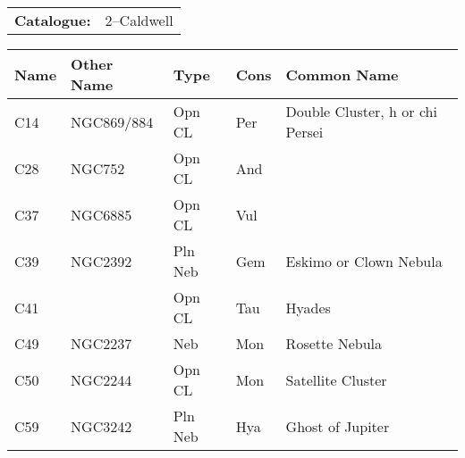 \begin{tabular}{ p{0.9in} p{1.3in}}
{\bf Catalogue:} & 2--Caldwell \\ 
\end{tabular}
\begin{longtable}{ p{0.7in}  p{1.0in}  p{0.6in}  p{0.9in}  p{5.1in} }
\hline 
{\bf Name} & {\bf Other Name} & {\bf Type} & {\bf Cons} & {\bf Common Name} \\ 
\hline 
C14 & NGC869/884 & Opn CL & Per & Double Cluster, h or chi Persei \\ 
C28 & NGC752 & Opn CL & And &  \\ 
C37 & NGC6885 & Opn CL & Vul &  \\ 
C39 & NGC2392 & Pln Neb & Gem & Eskimo or Clown Nebula \\ 
C41 &  & Opn CL & Tau & Hyades \\ 
C49 & NGC2237 & Neb & Mon & Rosette Nebula \\ 
C50 & NGC2244 & Opn CL & Mon & Satellite Cluster \\ 
C59 & NGC3242 & Pln Neb & Hya & Ghost of Jupiter \\ 
\hline 
\end{longtable} 
